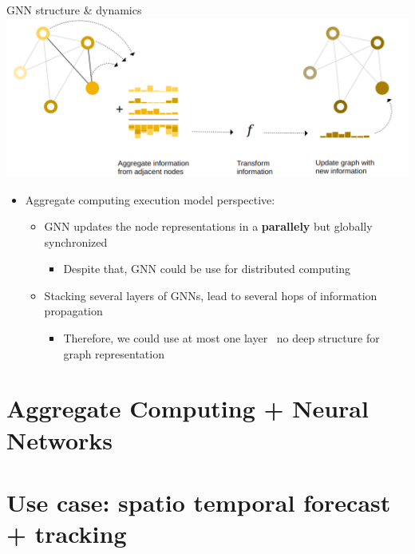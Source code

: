 \documentclass[presentation, 9pt]{beamer}\mode<presentation>{\usetheme{AMSBolognaFC}}
\begin{document}
\begin{frame}[fragile]{GNN structure \& dynamics}
	\includegraphics[width=\textwidth]{img/example-gnn.png}
	\begin{itemize}
		\item Aggregate computing execution model perspective:
		\begin{itemize}
			\item GNN updates the node representations in a \textbf{parallely} {\textcolor{darkcyan}\faThumbsUp} but globally synchronized {\textcolor{bolognafcred}\faThumbsDown}
			\begin{itemize}
				\item[{\textcolor{darkcyan}\faThumbsUp}] Despite that, GNN could be use for distributed computing
			\end{itemize} 
			\item Stacking several layers of GNNs, lead to several hops of information propagation
			\begin{itemize}
				\item Therefore, we could use at most one layer \faArrowRight \, no deep structure for graph representation
			\end{itemize}
		\end{itemize}
	\end{itemize}
\end{frame}

\section{Aggregate Computing + Neural Networks}


\section{Use case: spatio temporal forecast + tracking}
\end{document}
